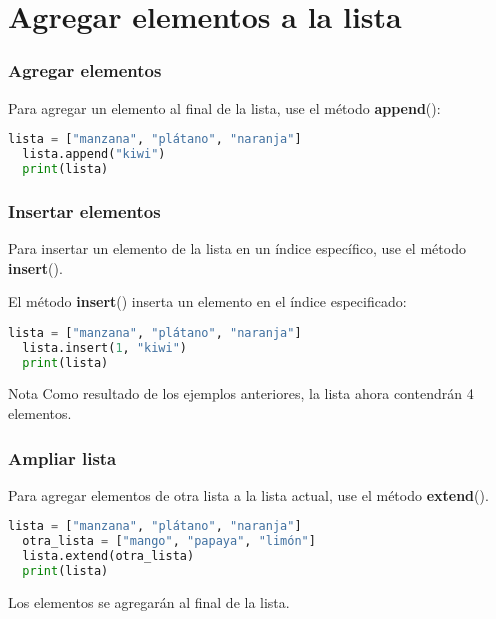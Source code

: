 \section{Agregar elementos a la lista}

\begin{frame}[fragile]
  \frametitle{Agregar elementos}

  Para agregar un elemento al final de la lista, use el método
  \textbf{append}():

  \vspace{\baselineskip}
  \begin{lstlisting}[language=Python]
  lista = ["manzana", "plátano", "naranja"]
  lista.append("kiwi")
  print(lista)
  \end{lstlisting}
\end{frame}

\begin{frame}[fragile]
  \frametitle{Insertar elementos}

  Para insertar un elemento de la lista en un índice específico,
  use el método \textbf{insert}().

  El método \textbf{insert}() inserta un elemento en el
  índice especificado: 

  \vspace{\baselineskip}
  \begin{lstlisting}[language=Python]
  lista = ["manzana", "plátano", "naranja"]
  lista.insert(1, "kiwi")
  print(lista)
  \end{lstlisting}

  \begin{exampleblock}{Nota}
    Como resultado de los ejemplos anteriores,
    la lista ahora contendrán 4 elementos.
  \end{exampleblock}{}
\end{frame}

\begin{frame}[fragile]
  \frametitle{Ampliar lista}

  Para agregar elementos de otra lista a la lista actual,
  use el método \textbf{extend}(). 

  \vspace{\baselineskip}
  \begin{lstlisting}[language=Python]
  lista = ["manzana", "plátano", "naranja"]
  otra_lista = ["mango", "papaya", "limón"]
  lista.extend(otra_lista)
  print(lista)
  \end{lstlisting}

  \vspace{\baselineskip}
  Los elementos se agregarán al final de la lista.
\end{frame}

